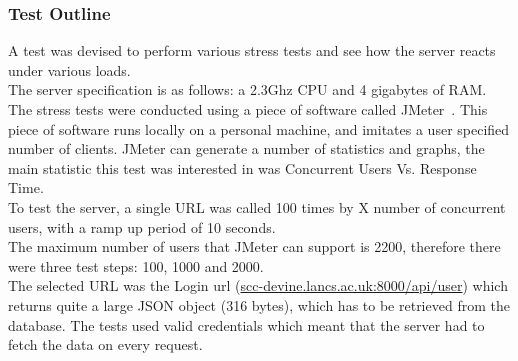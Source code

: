 \documentclass[preprint,12pt,3p]{elsarticle}
\begin{document}
\subsubsection{Test Outline}
A test was devised to perform various stress tests and see how the server reacts under various loads.\\
The server specification is as follows: a 2.3Ghz CPU and 4 gigabytes of RAM.\\
The stress tests were conducted using a piece of software called JMeter~\cite{jmeter}. This piece of software runs locally on a personal machine, and imitates a user specified number of clients. JMeter can generate a number of statistics and graphs, the main statistic this test was interested in was Concurrent Users Vs. Response Time.\\
To test the server, a single URL was called 100 times by X number of concurrent users, with a ramp up period of 10 seconds.\\
The maximum number of users that JMeter can support is 2200, therefore there were three test steps: 100, 1000 and 2000.\\
The selected URL was the Login url (\url{scc-devine.lancs.ac.uk:8000/api/user}) which returns quite a large JSON object (316 bytes), which has to be retrieved from the database. The tests used valid credentials which meant that the server had to fetch the data on every request.
\end{document}
